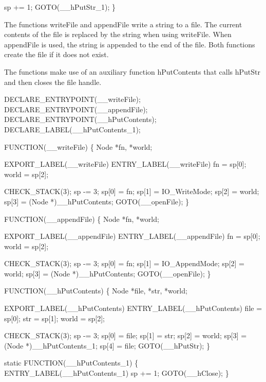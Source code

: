     sp += 1;
    GOTO(__hPutStr_1);
\}

\nwendcode{}\nwdocspar
The functions {\Tt{}writeFile\nwendquote} and {\Tt{}appendFile\nwendquote} write a string to a
file. The current contents of the file is replaced by the string
when using {\Tt{}writeFile\nwendquote}. When {\Tt{}appendFile\nwendquote} is used, the string is
appended to the end of the file. Both functions create the file if it
does not exist.

The functions make use of an auxiliary function {\Tt{}hPutContents\nwendquote} that
calls {\Tt{}hPutStr\nwendquote} and then closes the file handle.

\nwenddocs{}\plusendmoddef\nwstartdeflinemarkup{}\nwenddeflinemarkup
DECLARE_ENTRYPOINT(__writeFile);
DECLARE_ENTRYPOINT(__appendFile);
DECLARE_ENTRYPOINT(__hPutContents);
DECLARE_LABEL(__hPutContents_1);

FUNCTION(__writeFile)
\{
    Node *fn, *world;

    EXPORT_LABEL(__writeFile)
 ENTRY_LABEL(__writeFile)
    fn    = sp[0];
    world = sp[2];

    CHECK_STACK(3);
    sp   -= 3;
    sp[0] = fn;
    sp[1] = IO_WriteMode;
    sp[2] = world;
    sp[3] = (Node *)__hPutContents;
    GOTO(__openFile);
\}

FUNCTION(__appendFile)
\{
    Node *fn, *world;

    EXPORT_LABEL(__appendFile)
 ENTRY_LABEL(__appendFile)
    fn    = sp[0];
    world = sp[2];

    CHECK_STACK(3);
    sp   -= 3;
    sp[0] = fn;
    sp[1] = IO_AppendMode;
    sp[2] = world;
    sp[3] = (Node *)__hPutContents;
    GOTO(__openFile);
\}

FUNCTION(__hPutContents)
\{
    Node *file, *str, *world;

    EXPORT_LABEL(__hPutContents)
 ENTRY_LABEL(__hPutContents)
    file  = sp[0];
    str   = sp[1];
    world = sp[2];

    CHECK_STACK(3);
    sp   -= 3;
    sp[0] = file;
    sp[1] = str;
    sp[2] = world;
    sp[3] = (Node *)__hPutContents_1;
    sp[4] = file;
    GOTO(__hPutStr);
\}

static
FUNCTION(__hPutContents_1)
\{
 ENTRY_LABEL(__hPutContents_1)
    sp += 1;
    GOTO(__hClose);
\}

